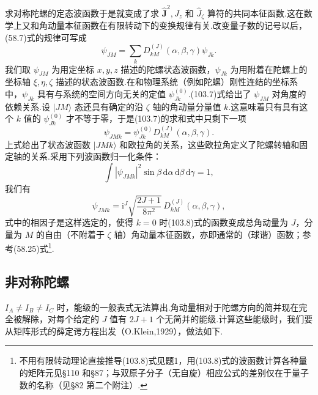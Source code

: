 求对称陀螺的定态波函数于是就变成了求 $\hat{\boldsymbol{J}}^2,J_z$ 和 $\hat{J}_\zeta$ 算符的共同本征函数.这在数学上又和角动量本征函数在有限转动下的变换规律有关.改变量子数的记号以后，(58.7)式的规律可写成
\begin{equation}
  \psi_{JM}=\sum_k D^{(J)}_{kM}(\alpha,\beta,\gamma)\psi_{Jk}.
\end{equation}
我们取 $\psi_{JM}$ 为用定坐标 $x,y,z$ 描述的陀螺状态波函数，$\psi_{Jk}$ 为用附着在陀螺上的坐标轴 $\xi,\eta,\zeta$ 描述的状态波函数.在和物理系统（例如陀螺）刚性连结的坐标系中，$\psi_{Jk}$ 具有与系统的空间方向无关的定值 $\psi_{Jk}^{(0)}$.(103.7)式给出了 $\psi_{JM}$ 对角度的依赖关系.设 $|JM\rangle$ 态还具有确定的沿 $\zeta$ 轴的角动量分量值 $k$.这意味着只有具有这个 $k$ 值的 $\psi_{Jk}^{(0)}$ 才不等于零，于是(103.7)的求和式中只剩下一项
\begin{equation*}
  \psi_{JMk}=\psi_{Jk}^{(0)}D^{(J)}_{kM}(\alpha,\beta,\gamma).
\end{equation*}
上式给出了状态波函数 $|JMk\rangle$ 和欧拉角的关系，这些欧拉角定义了陀螺转轴和固定轴的关系.采用下列波函数归一化条件：
\begin{equation*}
  \int|\psi_{JMk}|^2\sin\beta\,\mathrm{d}\alpha\,\mathrm{d}\beta\,\mathrm{d}\gamma=1,
\end{equation*}
我们有
\begin{equation}
  \psi_{JMk}=\mathrm{i}^J\sqrt{\frac{2J+1}{8\pi^2}}\,
  D^{(J)}_{kM}(\alpha,\beta,\gamma),
\end{equation}
式中的相因子是这样选定的，使得 $k=0$ 时(103.8)式的函数变成总角动量为 $J$，分量为 $M$ 的自由（不附着于 $\zeta$ 轴）角动量本征函数，亦即通常的（球谐）函数；参考(58.25)式\footnote{不用有限转动理论直接推导(103.8)式见题1，用(103.8)式的波函数计算各种量的矩阵元见§110 和§87；与双原子分子（无自旋）相应公式的差别仅在于量子数的名称（见§82 第二个附注）.}.

\subsection*{非对称陀螺}

$I_A\neq I_B\neq I_C$ 时，能级的一般表式无法算出.角动量相对于陀螺方向的简并现在完全被解除，对每个给定的 $J$ 值有 $2J+1$ 个无简并的能级.计算这些能级时，我们要从矩阵形式的薛定谔方程出发（O.Klein,1929），做法如下.

